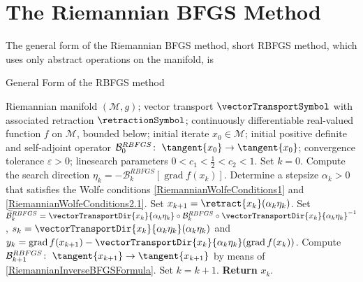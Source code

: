 \section{The Riemannian BFGS Method}
\label{Section4.4}

The general form of the Riemannian BFGS method, short RBFGS method, which uses only abstract operations on the manifold, is 

\begin{algorithm}[H]
    \caption{General Form of the RBFGS method}\label{InverseGlobalRiemannianBFGS-General}
    \begin{algorithmic}[1]
        \State Riemannian manifold $(\mathcal{M}, g)$; vector transport $\vectorTransportSymbol$ with associated retraction $\retractionSymbol$; continuously differentiable real-valued function $f$ on $\mathcal{M}$, bounded below; initial iterate $x_0 \in \mathcal{M}$; initial positive definite and self-adjoint operator $\mathcal{B}^{RBFGS}_0 \colon \; \tangent{x_0} \to \tangent{x_0}$; convergence tolerance $\varepsilon > 0$; linesearch parameters $0 < c_1 < \frac{1}{2} < c_2 < 1$. Set $k = 0$.
            \State Compute the search direction $\eta_k = - \mathcal{B}^{RBFGS}_k [\operatorname{grad} f(x_k)]$.
            \State Determine a stepsize $\alpha_k > 0$ that satisfies the Wolfe conditions \cref{RiemannianWolfeConditions1} and \cref{RiemannianWolfeConditions2.1}. 
            \State Set $x_{k+1} = \retract{x_k}(\alpha_k \eta_k)$.
            \State Set $\widetilde{\mathcal{B}}^{RBFGS}_k = \vectorTransportDir{x_k}{\alpha_k \eta_k} \circ \mathcal{B}^{RBFGS}_k \circ {\vectorTransportDir{x_k}{\alpha_k \eta_k}}^{-1}$, $s_k = \vectorTransportDir{x_k}{\alpha_k \eta_k}(\alpha_k \eta_k)$ and 
            \StatexIndent[2] $y_k = \operatorname{grad} f(x_{k+1}) - \vectorTransportDir{x_k}{\alpha_k \eta_k}(\operatorname{grad} f(x_k))$.
            \State Compute $\mathcal{B}^{RBFGS}_{k+1} \colon \; \tangent{x_{k+1}} \to \tangent{x_{k+1}}$ by means of \cref{RiemannianInverseBFGSFormula}. 
            \State Set $k = k+1$.
        \EndWhile
        \State \textbf{Return} $x_k$.
    \end{algorithmic}
\end{algorithm}

